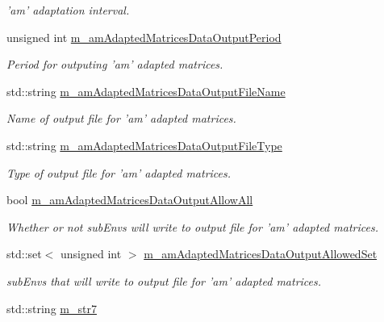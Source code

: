 \begin{DoxyCompactItemize}
\begin{DoxyCompactList}\small\item\em 'am' adaptation interval. \end{DoxyCompactList}\item 
unsigned int \hyperlink{class_q_u_e_s_o_1_1_m_l_sampling_level_options_a8c7ce073c75774afdbffa1ba3674085c}{m\-\_\-am\-Adapted\-Matrices\-Data\-Output\-Period}
\begin{DoxyCompactList}\small\item\em Period for outputing 'am' adapted matrices. \end{DoxyCompactList}\item 
std\-::string \hyperlink{class_q_u_e_s_o_1_1_m_l_sampling_level_options_a7dde9af112143992a87a72635e63a864}{m\-\_\-am\-Adapted\-Matrices\-Data\-Output\-File\-Name}
\begin{DoxyCompactList}\small\item\em Name of output file for 'am' adapted matrices. \end{DoxyCompactList}\item 
std\-::string \hyperlink{class_q_u_e_s_o_1_1_m_l_sampling_level_options_ab209a7f5dac6c2b4e108a7a1829631c6}{m\-\_\-am\-Adapted\-Matrices\-Data\-Output\-File\-Type}
\begin{DoxyCompactList}\small\item\em Type of output file for 'am' adapted matrices. \end{DoxyCompactList}\item 
bool \hyperlink{class_q_u_e_s_o_1_1_m_l_sampling_level_options_ad1ac51fd4b35c5decca04048ebeca3f2}{m\-\_\-am\-Adapted\-Matrices\-Data\-Output\-Allow\-All}
\begin{DoxyCompactList}\small\item\em Whether or not sub\-Envs will write to output file for 'am' adapted matrices. \end{DoxyCompactList}\item 
std\-::set$<$ unsigned int $>$ \hyperlink{class_q_u_e_s_o_1_1_m_l_sampling_level_options_a7bab0713dca38607204e38ce661799bb}{m\-\_\-am\-Adapted\-Matrices\-Data\-Output\-Allowed\-Set}
\begin{DoxyCompactList}\small\item\em sub\-Envs that will write to output file for 'am' adapted matrices. \end{DoxyCompactList}\item 
std\-::string \hyperlink{class_q_u_e_s_o_1_1_m_l_sampling_level_options_a062489e53dd259c548d7ea9ed9428377}{m\-\_\-str7}

\end{DoxyCompactItemize}
